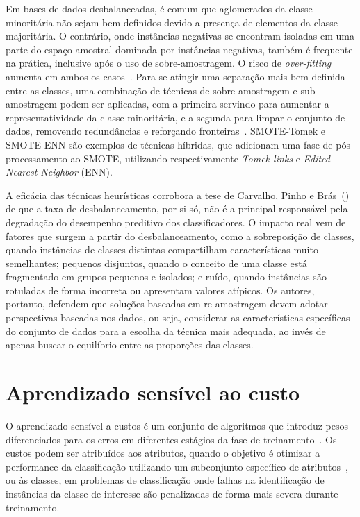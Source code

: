 Em bases de dados desbalanceadas, é comum que aglomerados da classe minoritária não sejam bem definidos devido a presença de elementos da classe majoritária. O contrário, onde instâncias negativas se encontram isoladas em uma parte do espaço amostral dominada por instâncias negativas, também é frequente na prática, inclusive após o uso de sobre-amostragem. O risco de \textit{over-fitting} aumenta em ambos os casos~\cite{Batista2004}. Para se atingir uma separação mais bem-definida entre as classes, uma combinação de técnicas de sobre-amostragem e sub-amostragem podem ser aplicadas, com a primeira servindo para aumentar a representatividade da classe minoritária, e a segunda para limpar o conjunto de dados, removendo redundâncias e reforçando fronteiras~\cite{Pereira2020}. SMOTE-Tomek e SMOTE-ENN são exemplos de técnicas híbridas, que adicionam uma fase de pós-processamento ao SMOTE, utilizando respectivamente \textit{Tomek links} e \textit{Edited Nearest Neighbor} (ENN).

A eficácia das técnicas heurísticas corrobora a tese de Carvalho, Pinho e Brás~(\citeyear{Carvalho2025}) de que a taxa de desbalanceamento, por si só, não é a principal responsável pela degradação do desempenho preditivo dos classificadores. O impacto real vem de fatores que surgem a partir do desbalanceamento, como a sobreposição de classes, quando instâncias de classes distintas compartilham características muito semelhantes; pequenos disjuntos, quando o conceito de uma classe está fragmentado em grupos pequenos e isolados; e ruído, quando instâncias são rotuladas de forma incorreta ou apresentam valores atípicos. Os autores, portanto, defendem que soluções baseadas em re-amostragem devem adotar perspectivas baseadas nos dados, ou seja, considerar as características específicas do conjunto de dados para a escolha da técnica mais adequada, ao invés de apenas buscar o equilíbrio entre as proporções das classes.

\section{Aprendizado sensível ao custo}

O aprendizado sensível a custos é um conjunto de algoritmos que introduz pesos diferenciados para os erros em diferentes estágios da fase de treinamento~\cite{FernndezCs2018}. Os custos podem ser atribuídos aos atributos, quando o objetivo é otimizar a performance da classificação utilizando um subconjunto específico de atributos~\cite{Zhou2016}, ou às classes, em problemas de classificação onde falhas na identificação de instâncias da classe de interesse são penalizadas de forma mais severa durante treinamento.

